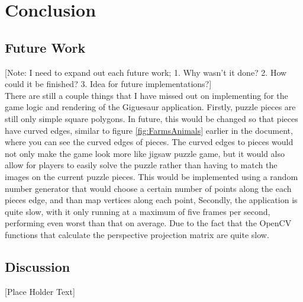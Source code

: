 \documentclass{article}
\begin{document}

\section{Conclusion}

\subsection{Future Work}
[Note: I need to expand out each future work; 1. Why wasn't it done? 2. How
  could it be finished? 3. Idea for future implementations?]\\

There are still a couple things that I have missed out on implementing for the
game logic and rendering of the Giguesaur application. Firstly, puzzle pieces
are still only simple square polygons. In future, this would be changed so that
pieces have curved edges, similar to figure \ref{fig:FarmsAnimals} earlier in
the document, where you can see the curved edges of pieces. The curved edges to
pieces would not only make the game look more like jigsaw puzzle game, but it
would also allow for players to easily solve the puzzle rather than having to
match the images on the current puzzle pieces. This would be implemented using a
random number generator that would choose a certain number of points along the each pieces edge, and than map vertices along each point, Secondly, the
application is quite slow, with it only running at a maximum of five frames per
second, performing even worst than that on average. Due to the fact that the
OpenCV functions that calculate the perspective projection matrix are quite
slow.

\subsection{Discussion}
[Place Holder Text]


\clearpage



\end{document}
